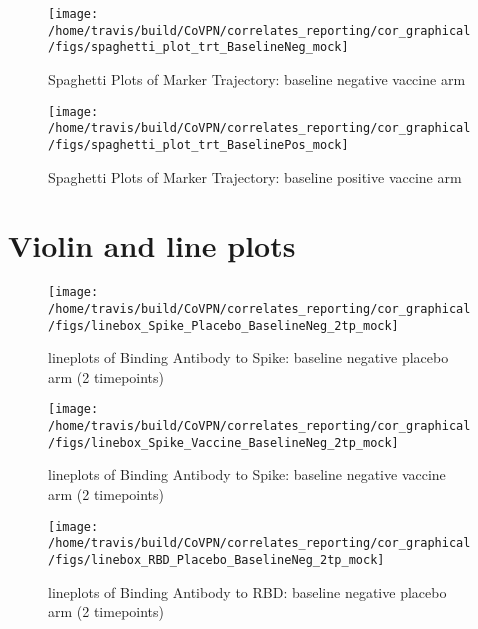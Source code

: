 \documentclass[]{book}
\theoremstyle{definition}
\theoremstyle{definition}
\theoremstyle{definition}
\newcommand{\1}{\mathbbm{1}}
\begin{document}
\begin{figure}[H]

{\centering \texttt{[image: /home/travis/build/CoVPN/correlates\_reporting/cor\_graphical/figs/spaghetti\_plot\_trt\_BaselineNeg\_mock]} 

}

\caption{Spaghetti Plots of Marker Trajectory: baseline negative vaccine arm}\label{fig:unnamed-chunk-25}
\end{figure}
\clearpage
\begin{figure}[H]

{\centering \texttt{[image: /home/travis/build/CoVPN/correlates\_reporting/cor\_graphical/figs/spaghetti\_plot\_trt\_BaselinePos\_mock]} 

}

\caption{Spaghetti Plots of Marker Trajectory: baseline positive vaccine arm}\label{fig:unnamed-chunk-26}
\end{figure}

\clearpage

\hypertarget{violin-and-line-plots}{%
\section{Violin and line plots}\label{violin-and-line-plots}}

\begin{figure}[H]

{\centering \texttt{[image: /home/travis/build/CoVPN/correlates\_reporting/cor\_graphical/figs/linebox\_Spike\_Placebo\_BaselineNeg\_2tp\_mock]} 

}

\caption{lineplots of Binding Antibody to Spike: baseline negative placebo arm (2 timepoints)}\label{fig:unnamed-chunk-27}
\end{figure}

\clearpage
\begin{figure}[H]

{\centering \texttt{[image: /home/travis/build/CoVPN/correlates\_reporting/cor\_graphical/figs/linebox\_Spike\_Vaccine\_BaselineNeg\_2tp\_mock]} 

}

\caption{lineplots of Binding Antibody to Spike: baseline negative vaccine arm (2 timepoints)}\label{fig:unnamed-chunk-28}
\end{figure}

\clearpage
\begin{figure}[H]

{\centering \texttt{[image: /home/travis/build/CoVPN/correlates\_reporting/cor\_graphical/figs/linebox\_RBD\_Placebo\_BaselineNeg\_2tp\_mock]} 

}

\caption{lineplots of Binding Antibody to RBD: baseline negative placebo arm (2 timepoints)}\label{fig:unnamed-chunk-29}
\end{figure}
\end{document}
